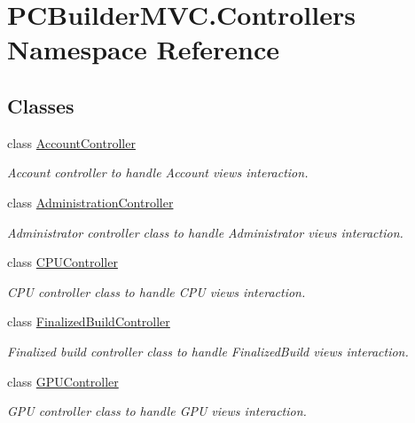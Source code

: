 \hypertarget{namespace_p_c_builder_m_v_c_1_1_controllers}{}\section{P\+C\+Builder\+M\+V\+C.\+Controllers Namespace Reference}
\label{namespace_p_c_builder_m_v_c_1_1_controllers}
\subsection*{Classes}
\begin{DoxyCompactItemize}
\item 
class \hyperlink{class_p_c_builder_m_v_c_1_1_controllers_1_1_account_controller}{Account\+Controller}
\begin{DoxyCompactList}\small\item\em Account controller to handle Account views interaction. \end{DoxyCompactList}\item 
class \hyperlink{class_p_c_builder_m_v_c_1_1_controllers_1_1_administration_controller}{Administration\+Controller}
\begin{DoxyCompactList}\small\item\em Administrator controller class to handle Administrator views interaction. \end{DoxyCompactList}\item 
class \hyperlink{class_p_c_builder_m_v_c_1_1_controllers_1_1_c_p_u_controller}{C\+P\+U\+Controller}
\begin{DoxyCompactList}\small\item\em C\+PU controller class to handle C\+PU views interaction. \end{DoxyCompactList}\item 
class \hyperlink{class_p_c_builder_m_v_c_1_1_controllers_1_1_finalized_build_controller}{Finalized\+Build\+Controller}
\begin{DoxyCompactList}\small\item\em Finalized build controller class to handle Finalized\+Build views interaction. \end{DoxyCompactList}\item 
class \hyperlink{class_p_c_builder_m_v_c_1_1_controllers_1_1_g_p_u_controller}{G\+P\+U\+Controller}
\begin{DoxyCompactList}\small\item\em G\+PU controller class to handle G\+PU views interaction. \end{DoxyCompactList}\item 

\end{DoxyCompactItemize}
